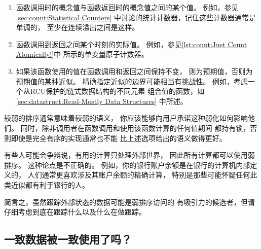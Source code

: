 \begin{enumerate}
\item	函数调用时的概念值与函数返回时的概念值之间的某个值。
	例如，参见\cref{sec:count:Statistical Counters}
	中讨论的统计计数器，记住这些计数器通常是单调的，
	至少在连续溢出之间是这样。
\item	函数调用到返回之间某个时刻的实际值。
	例如，参见\cref{lst:count:Just Count Atomically!}中
	所示的单变量原子计数器。
\item	如果该函数使用的值在函数调用和返回之间保持不变，
	则为预期值，否则为预期值的某种近似。
	精确指定近似的边界可能相当有挑战性。
	例如，考虑一个从RCU保护的链式数据结构的不同元素
	组合值的函数，如\cref{sec:datastruct:Read-Mostly Data Structures}
	中所述。
\end{enumerate}

较弱的排序通常意味着较弱的语义，
你应该能够向用户承诺这种弱化如何影响他们。
同时，除非调用者在函数调用和使用该函数计算的任何值期间
都持有锁，否则即使是完全有序的实现通常也不能
比上述选项给出的语义做得更好。

\QuickQuizEnd

有些人可能会争辩说，有用的计算只处理外部世界，
因此所有计算都可以使用弱排序。
这种论点是不正确的。
例如，你的银行账户余额是在银行的计算机内部定义的，
人们通常更喜欢涉及其账户余额的精确计算，
特别是那些可能怀疑任何此类近似都有利于银行的人。

简言之，虽然跟踪外部状态的数据可能是弱排序访问的
有吸引力的候选者，但请仔细考虑到底在跟踪什么以及什么在做跟踪。

\subsection{一致数据被一致使用了吗？}
\label{sec:app:questions:Consistent Data Used Consistently?}

